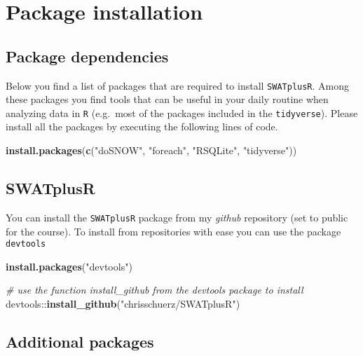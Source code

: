 \documentclass[11pt,]{article}
\newenvironment{Shaded}{}{}
\newcommand{\KeywordTok}[1]{\textcolor[rgb]{0.00,0.44,0.13}{\textbf{#1}}}
\newcommand{\StringTok}[1]{\textcolor[rgb]{0.25,0.44,0.63}{#1}}
\newcommand{\CommentTok}[1]{\textcolor[rgb]{0.38,0.63,0.69}{\textit{#1}}}
\newcommand{\OperatorTok}[1]{\textcolor[rgb]{0.40,0.40,0.40}{#1}}
\newcommand{\NormalTok}[1]{#1}
\begin{document}
\section{Package installation}\label{package-installation}

\subsection{Package dependencies}\label{package-dependencies}

Below you find a list of packages that are required to install
\texttt{SWATplusR}. Among these packages you find tools that can be
useful in your daily routine when analyzing data in \texttt{R}
(e.g.~most of the packages included in the \texttt{tidyverse}). Please
install all the packages by executing the following lines of code.

\begin{Shaded}
\begin{Highlighting}[]
\KeywordTok{install.packages}\NormalTok{(}\KeywordTok{c}\NormalTok{(}\StringTok{"doSNOW"}\NormalTok{, }\StringTok{"foreach"}\NormalTok{, }\StringTok{"RSQLite"}\NormalTok{, }\StringTok{"tidyverse"}\NormalTok{))}
\end{Highlighting}
\end{Shaded}

\subsection{SWATplusR}\label{swatplusr}

You can install the \texttt{SWATplusR} package from my \emph{github}
repository (set to public for the course). To install from repositories
with ease you can use the package \texttt{devtools}

\begin{Shaded}
\begin{Highlighting}[]
\KeywordTok{install.packages}\NormalTok{(}\StringTok{"devtools"}\NormalTok{)}

\CommentTok{# use the function install_github from the devtools package to install}
\NormalTok{devtools}\OperatorTok{::}\KeywordTok{install_github}\NormalTok{(}\StringTok{"chrisschuerz/SWATplusR"}\NormalTok{)}
\end{Highlighting}
\end{Shaded}

\subsection{Additional packages}\label{additional-packages}
\end{document}
